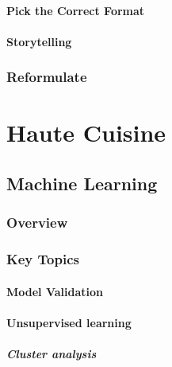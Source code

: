 \documentclass[
]{book}
\begin{document}
\hypertarget{pick-the-correct-format}{%
\subsection{Pick the Correct Format}\label{pick-the-correct-format}}

\hypertarget{storytelling}{%
\subsection{Storytelling}\label{storytelling}}

\hypertarget{reformulate2}{%
\section{Reformulate}\label{reformulate2}}

\hypertarget{part-haute-cuisine}{%
\part*{Haute Cuisine}\label{part-haute-cuisine}}

\hypertarget{machine-learning}{%
\chapter{Machine Learning}\label{machine-learning}}

\hypertarget{overview}{%
\section{Overview}\label{overview}}

\hypertarget{key-topics}{%
\section{Key Topics}\label{key-topics}}

\hypertarget{model-validation}{%
\subsection{Model Validation}\label{model-validation}}

\hypertarget{unsupervised-learning}{%
\subsection{Unsupervised learning}\label{unsupervised-learning}}

\hypertarget{cluster-analysis}{%
\subsubsection{Cluster analysis}\label{cluster-analysis}}
\end{document}
